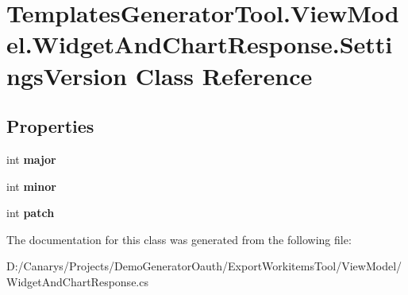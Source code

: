 \hypertarget{class_templates_generator_tool_1_1_view_model_1_1_widget_and_chart_response_1_1_settings_version}{}\section{Templates\+Generator\+Tool.\+View\+Model.\+Widget\+And\+Chart\+Response.\+Settings\+Version Class Reference}
\label{class_templates_generator_tool_1_1_view_model_1_1_widget_and_chart_response_1_1_settings_version}
\subsection*{Properties}
\begin{DoxyCompactItemize}
\item 
\mbox{\label{class_templates_generator_tool_1_1_view_model_1_1_widget_and_chart_response_1_1_settings_version_aaf706eefe326678f8223769360501da2}} 
int {\bfseries major}
\item 
\mbox{\label{class_templates_generator_tool_1_1_view_model_1_1_widget_and_chart_response_1_1_settings_version_ad324aa849cdd74903ed41f32f4a726d4}} 
int {\bfseries minor}
\item 
\mbox{\label{class_templates_generator_tool_1_1_view_model_1_1_widget_and_chart_response_1_1_settings_version_a1fb2e8d98d82e357c22178c29f4596b7}} 
int {\bfseries patch}
\end{DoxyCompactItemize}


The documentation for this class was generated from the following file\+:\begin{DoxyCompactItemize}
\item 
D\+:/\+Canarys/\+Projects/\+Demo\+Generator\+Oauth/\+Export\+Workitems\+Tool/\+View\+Model/Widget\+And\+Chart\+Response.\+cs\end{DoxyCompactItemize}
